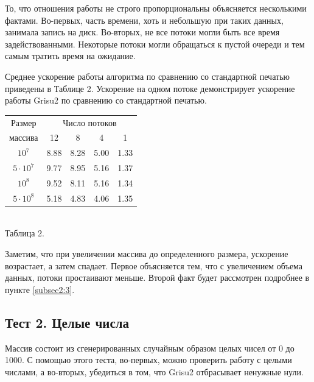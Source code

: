 То, что отношения работы не строго пропорциональны объясняется несколькими фактами.
Во-первых, часть времени, хоть и небольшую при таких данных, занимала запись на диск.
Во-вторых, не все потоки могли быть все время задействованными.
Некоторые потоки могли обращаться к пустой очереди и тем самым тратить время на ожидание.

Среднее ускорение работы алгоритма по сравнению со стандартной печатью приведены в Таблице 2.
Ускорение на одном потоке демонстрирует ускорение работы \textsf{Grisu2} по сравнению со стандартной печатью.
\begin{center}
\begin{tabular}{||c|c|c|c|c||}
\hline
\hline
Размер & \multicolumn{4}{c||}{Число потоков}\\
\hhline{~|-|-|-|-|}
массива & 12 & 8 & 4 & 1 \\
\hline
$10^7$ &  8.88 & 8.28 & 5.00 & 1.33 \\
\hline
$5 \cdot 10^7$ & 9.77& 8.95 & 5.16 & 1.37 \\
\hline
$10^8$ & 9.52 & 8.11 & 5.16 & 1.34\\
\hline
$5 \cdot 10^8$ & 5.18 & 4.83 & 4.06 & 1.35\\
\hline
\hline
\end{tabular}
\\
\vspace{14pt}
\small{Таблица 2.}
\end{center}

Заметим, что при увеличении массива до определенного размера, ускорение возрастает, а затем спадает.
Первое объясняется тем, что с увеличением объема данных, потоки простаивают меньше.
Второй факт будет рассмотрен подробнее в пункте \ref{subsec2:3}.

\subsection{Тест 2. Целые числа} \label{test2}
Массив состоит из сгенерированных случайным образом целых чисел от 0 до 1000.
С помощью этого теста, во-первых, можно проверить работу с целыми числами, а во-вторых, убедиться в том, что \textsf{Grisu2} отбрасывает ненужные нули.

